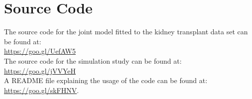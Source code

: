 
\section{Source Code}
The source code for the joint model fitted to the kidney transplant data set can be found at:\\
\url{https://goo.gl/UefAW5}\\
The source code for the simulation study can be found at:\\
\url{https://goo.gl/jVVYeH}\\
A README file explaining the usage of the code can be found at:\\
\url{https://goo.gl/skFHNV}.\\

